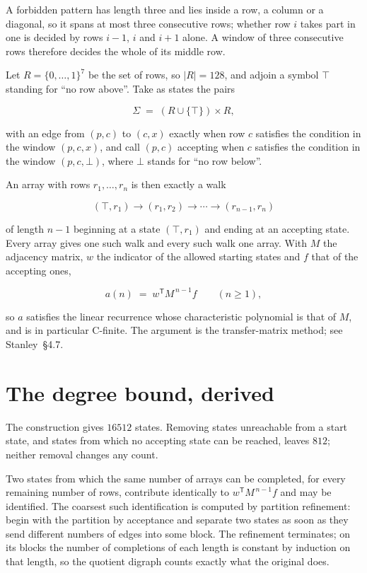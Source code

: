 \documentclass[11pt]{article}
\theoremstyle{definition}
\begin{document}
A forbidden pattern has length three and lies inside a row, a column or a diagonal, so it spans at most three consecutive rows; whether row $i$ takes part in one is decided by rows $i-1$, $i$ and $i+1$ alone. A window of three consecutive rows therefore decides the whole of its middle row.

Let $R = \{0,\dots,1\}^{7}$ be the set of rows, so $|R| = 128$, and adjoin a symbol $\top$ standing for ``no row above''. Take as states the pairs

\[\Sigma \;=\; (R \cup \{\top\}) \times R,\]

with an edge from $(p,c)$ to $(c,x)$ exactly when row $c$ satisfies the condition in the window $(p,c,x)$, and call $(p,c)$ accepting when $c$ satisfies the condition in the window $(p,c,\bot)$, where $\bot$ stands for ``no row below''.

An array with rows $r_1,\dots,r_n$ is then exactly a walk

\[(\top,r_1) \to (r_1,r_2) \to \cdots \to (r_{n-1},r_n)\]

of length $n-1$ beginning at a state $(\top,r_1)$ and ending at an accepting state. Every array gives one such walk and every such walk one array. With $M$ the adjacency matrix, $w$ the indicator of the allowed starting states and $f$ that of the accepting ones,

\[a(n) \;=\; w^{\mathsf T} M^{\,n-1} f \qquad (n \ge 1),\]

so $a$ satisfies the linear recurrence whose characteristic polynomial is that of $M$, and is in particular C-finite. The argument is the transfer-matrix method; see Stanley~\S4.7.

\section{The degree bound, derived}

The construction gives $16512$ states. Removing states unreachable from a start state, and states from which no accepting state can be reached, leaves $812$; neither removal changes any count.

Two states from which the same number of arrays can be completed, for every remaining number of rows, contribute identically to $w^{\mathsf T}M^{\,n-1}f$ and may be identified. The coarsest such identification is computed by partition refinement: begin with the partition by acceptance and separate two states as soon as they send different numbers of edges into some block. The refinement terminates; on its blocks the number of completions of each length is constant by induction on that length, so the quotient digraph counts exactly what the original does.
\end{document}
